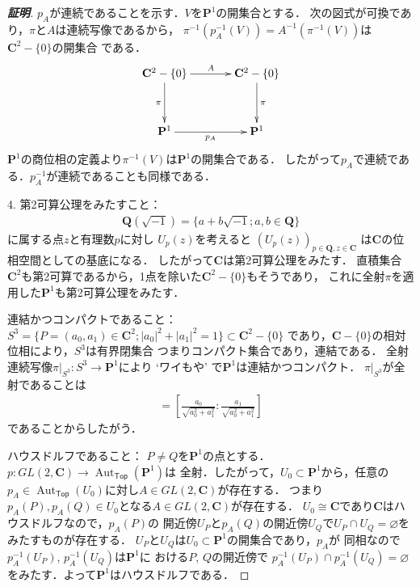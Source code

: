 \documentclass[11pt, a4paper, dvipdfmx, draft]{jsarticle}
\theoremstyle{definition}
\newcommand{\qq}{\mathbf{Q}}
\newcommand{\cc}{\mathbf{C}}
\newcommand{\pp}{\mathbf{P}}
\newcommand{\Aut}{\mathop{\mathrm{Aut}}\nolimits}
\newcommand{\emp}{\varnothing}
\newcommand{\mapres}[2]{\left. #1 \right|_{#2}}
\newcommand{\tTop}{\textsf{Top}}
\theoremstyle{mystyle}
\numberwithin{equation}{section} %
\begin{document}
\begin{proof}[\textbf{証明}]
    $p_A$が連続であることを示す．$V$を$\pp^1$の開集合とする．
    次の図式が可換であり，$\pi$と$A$は連続写像であるから，
    $\pi^{-1}\left(p_A^{-1}(V)\right)
    =A^{-1}\left(\pi^{-1}(V)\right)$は$\cc^2-\{0\}$の開集合
    である．
    \begin{equation*}
        \vcenter{\xymatrix@C=36pt@R=36pt{
        \cc^2-\{0\} 
        \ar@{{}->}[d]_{\pi} 
        \ar@{{}->}[r]^-{A} 
        & \cc^2-\{0\} 
        \ar@{{}->}[d]^{\pi} 
        \\
        \pp^1 \ar[r]_{p_A}  
        & \pp^1 \ar@{}[lu]
        }}
    \end{equation*}
    $\pp^{1}$の商位相の定義より$\pi^{-1}(V)$は$\pp^{1}$の開集合である．
    したがって$p_A$で連続である．$p_A^{-1}$が連続であることも同様である．

    4. 
    第2可算公理をみたすこと：
    \begin{align*}
        \qq(\sqrt{-1})=\{a+b\sqrt{-1};a,b\in\qq\}
    \end{align*}
    に属する点$z$と有理数$p$に対し
    $U_{p}(z)$を考えると
    $\left(U_{p}(z)\right)_{p\in\qq,z\in\cc}$
    は$\cc$の位相空間としての基底になる．
    したがって$\cc$は第2可算公理をみたす．
    直積集合$\cc^2$も第2可算であるから，1点を除いた$\cc^2-\{0\}$もそうであり，
    これに全射$\pi$を適用した$\pp^1$も第2可算公理をみたす．

    連結かつコンパクトであること：
    $S^3=\{P=(a_0,a_1)\in\cc^2;|a_0|^2+|a_1|^2=1\}\subset\cc^2-\{0\}$
    であり，$\cc-\{0\}$の相対位相により，$S^3$は有界閉集合
    つまりコンパクト集合であり，連結である．
    全射連続写像$\mapres{\pi}{S^3}\colon S^3\to\pp^1$により 
    `ワイもや' で$\pp^1$は連結かつコンパクト．
    $\mapres{\pi}{S^3}$が全射であることは
    \begin{align*}
        [a_0\colon a_1]
        =
        \left[
            \frac{a_0}{\sqrt{a_0^2+a_1^2}}\colon \frac{a_1}{\sqrt{a_0^2+a_1^2}}
        \right]
    \end{align*}
    であることからしたがう．

    ハウスドルフであること：
    $P\neq Q$を$\pp^1$の点とする．
    $p\colon GL(2,\cc)\to \Aut_{\tTop}(\pp^1)$は
    全射．したがって，$U_0\subset \pp^1$から，任意の
    $p_{A}\in \Aut_{\tTop}(U_0)$に対し$A\in GL(2,\cc)$が存在する．
    つまり$p_A(P),p_A(Q)\in U_0$となる$A\in GL(2,\cc)$が存在する．
    $U_0\cong \cc$であり$\cc$はハウスドルフなので，$p_A(P)$の
    開近傍$U_P$と$p_A(Q)$の開近傍$U_Q$で$U_P\cap U_Q=\emp$を
    みたすものが存在する．
    $U_P$と$U_Q$は$U_0\subset\pp^1$の開集合であり，$p_{A}$が
    同相なので$p_A^{-1}(U_P)$, $p_A^{-1}(U_Q)$は$\pp^1$に
    おける$P$, $Q$の開近傍で
    $p_A^{-1}(U_P)\cap p_A^{-1}(U_Q)=\emp$
    をみたす．よって$\pp^1$はハウスドルフである．
\end{proof}
\end{document}
